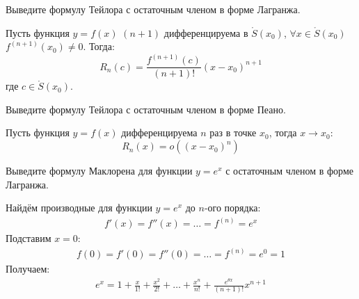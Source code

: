 \begin{question}
    Выведите формулу Тейлора с остаточным членом в форме Лагранжа.
\end{question}
\begin{theorem}
    Пусть функция $y=f(x)$  $(n+1)$ дифференцируема в $\mathring{S}(x_0)$, $\forall x \in \mathring{S}(x_0)$ $f^{(n+1)}(x_0) \neq 0$.
    Тогда: \[
        R_n(c) = \frac{f^{(n+1)}(c)}{(n+1)!}(x-x_0)^{n+1}
    \]
    где $c \in \mathring{S}(x_0)$.
\end{theorem}
\pagebreak



\begin{question}
    Выведите формулу Тейлора с остаточным членом в форме Пеано.
\end{question}
\begin{theorem}
    Пусть функция $y = f(x)$ дифференцируема $n$ раз в точке $x_0$, тогда $x \to x_0$: \[
        R_n(x) = o((x - x_0)^n)
    \] 
\end{theorem}
\pagebreak


\begin{question}
    Выведите формулу Маклорена для функции $y = e^x$ с остаточным членом в форме Лагранжа.
\end{question}
\begin{answer}
    Найдём производные для функции $y = e^x$ до $n$-ого порядка:
    \begin{gather*}
        f'(x) = f''(x) = \ldots = f ^{(n)} = e ^{x}
    \end{gather*}
    Подставим $x = 0$:
    \begin{gather*}
        f(0) = f'(0) = f''(0) = \ldots = f ^{(n)} = e^0 = 1
    \end{gather*}
    Получаем:
    \begin{gather*}
        e ^{x} = 1 + \frac{x}{1!} + \frac{x ^2}{2!} + \ldots + \frac{x^n}{n!} + \frac{e ^{\theta x}}{(n+1)!} x ^{n+1}
    \end{gather*}
\end{answer}
\pagebreak



